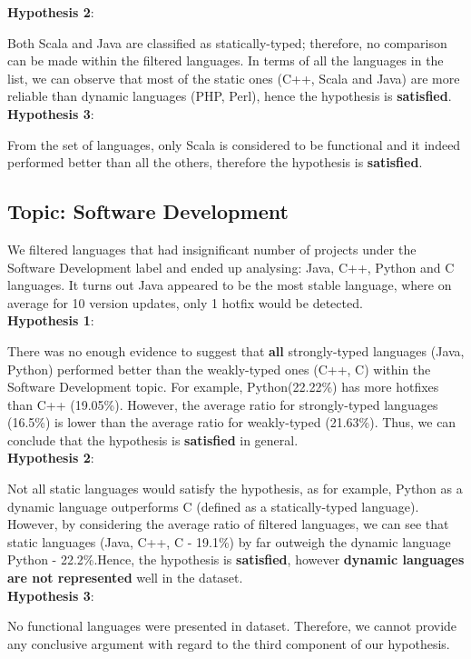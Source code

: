 \textbf{Hypothesis 2}:\par
Both Scala and Java are classified as statically-typed; therefore, no comparison can be made within the filtered languages. In terms of all the languages in the list, we can observe that most of the static ones (C++, Scala and Java) are more reliable than dynamic languages (PHP, Perl), hence the hypothesis is \textbf{satisfied}.\\

\textbf{Hypothesis 3}:\par
From the set of languages, only Scala is considered to be functional and it indeed performed better than all the others, therefore the hypothesis is \textbf{satisfied}.

\subsection{Topic: Software Development}
We filtered languages that had insignificant number of projects under the Software Development label and ended up analysing: Java, C++, Python and C languages. It turns out Java appeared to be the most stable language, where on average for 10 version updates, only 1 hotfix would be detected.\\

\textbf{Hypothesis 1}:\par
There was no enough evidence to suggest that \textbf{all} strongly-typed languages (Java, Python) performed better than the weakly-typed ones (C++, C) within the Software Development topic. For example, Python(22.22\%) has more hotfixes than C++ (19.05\%). However, the average ratio for strongly-typed languages (16.5\%) is lower than the average ratio for weakly-typed (21.63\%). Thus, we can conclude that the hypothesis is \textbf{satisfied} in general.\\

\textbf{Hypothesis 2}:\par
Not all static languages would satisfy the hypothesis, as for example, Python as a dynamic language outperforms C (defined as a statically-typed language). However, by considering the average ratio of filtered languages, we can see that static languages (Java, C++, C - 19.1\%) by far outweigh the dynamic language Python - 22.2\%.Hence, the hypothesis is \textbf{satisfied}, however \textbf{dynamic languages are not represented} well in the dataset.\\

\textbf{Hypothesis 3}:\par
No functional languages were presented in dataset. Therefore, we cannot provide any conclusive argument with regard to the third component of our hypothesis.

